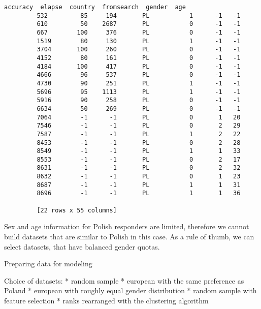 \documentclass[11pt]{article}
\begin{document}
\begin{Verbatim}[commandchars=\\\{\}]
               accuracy  elapse  country  fromsearch  gender  age  
         532         85     194       PL           1      -1   -1  
         610         50    2687       PL           0      -1   -1  
         667        100     376       PL           0      -1   -1  
         1519        80     130       PL           1      -1   -1  
         3704       100     260       PL           0      -1   -1  
         4152        80     161       PL           0      -1   -1  
         4184       100     417       PL           0      -1   -1  
         4666        96     537       PL           0      -1   -1  
         4730        90     251       PL           1      -1   -1  
         5696        95    1113       PL           1      -1   -1  
         5916        90     258       PL           0      -1   -1  
         6634        50     269       PL           0      -1   -1  
         7064        -1      -1       PL           0       1   20  
         7546        -1      -1       PL           0       2   29  
         7587        -1      -1       PL           1       2   22  
         8453        -1      -1       PL           0       2   28  
         8549        -1      -1       PL           1       1   33  
         8553        -1      -1       PL           0       2   17  
         8631        -1      -1       PL           0       2   32  
         8632        -1      -1       PL           0       1   23  
         8687        -1      -1       PL           1       1   31  
         8696        -1      -1       PL           1       1   36  
         
         [22 rows x 55 columns]
\end{Verbatim}
        
    Sex and age information for Polish responders are limited, therefore we
cannot build datasets that are similar to Polish in this case. As a rule
of thumb, we can select datasets, that have balanced gender quotas.

    {Preparing data for
modeling}\label{preparing-data-for-modeling}

    Choice of datasets: * random sample * european with the same preference
as Poland * european with roughly equal gender distribution * random
sample with feature selection * ranks rearranged with the clustering
algorithm
\end{document}
